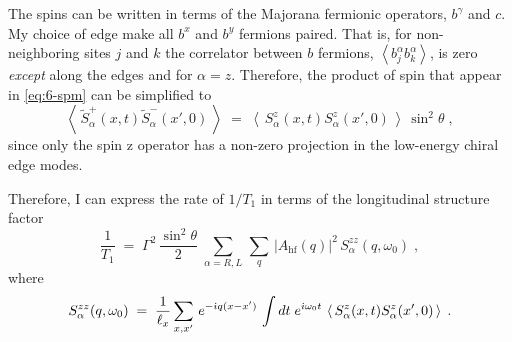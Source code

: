The spins can be written in terms of the Majorana fermionic operators, $b^{\gamma}$ and $c$. My choice of edge make all $b^x$ and $b^y$ fermions paired. That is, for non-neighboring sites $j$ and $k$ the correlator between $b$ fermions, $\left\langle b_j^{\alpha} b_k^{\alpha} \right\rangle$, is zero \textit{except} along the edges and for $\alpha = z$.  Therefore, the product of spin that appear in \eqref{eq:6-spm} can be simplified to 
\begin{equation}
    \left\langle \,  \tilde{S}_{\alpha}^{+}(x,t) \tilde{S}_{\alpha}^{-}(x',0) \,    \right\rangle  \; = \; \left\langle \,  S_{\alpha}^{z}(x,t) S_{\alpha}^{z}(x',0) \,    \right\rangle  \, \sin^2\theta \; ,
\end{equation}
since only the spin $\mathrm{z}$ operator has a non-zero projection in the low-energy chiral edge modes.



Therefore, I can express the rate of $1/T_1$ in terms of the longitudinal structure factor 
\begin{equation}
    \frac{1}{T_1} \; = \; \Gamma^2 \,  \frac{\sin^2 \theta}{2} \; \sum_{\alpha = R,L} \, \sum_{q} \, \vert A_{\text{hf}}(q) \vert^2 \, S^{zz}_{\alpha}(q,\omega_0) \; , \label{eq:6-t1.1}
\end{equation}
where
\begin{equation}
    S^{zz}_{\alpha}(q,\omega_0) \; = \; \frac{1}{\ell_x}\sum_{x,x'} \, e^{-\dot{\imath} q (x-x')}\, \int dt \; e^{\dot{\imath} \omega_0 t } \, \left\langle \,  S_{\alpha}^{z}(x,t) S_{\alpha}^{z}(x',0)   \, \right\rangle \; . 
\end{equation}

